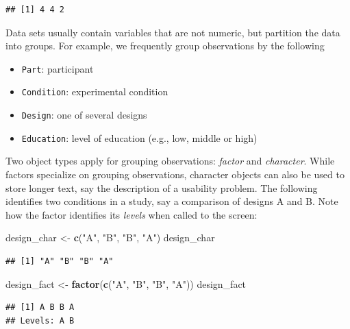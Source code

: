 \documentclass[]{svmono}
\newenvironment{Shaded}{\begin{snugshade}}{\end{snugshade}}
\newcommand{\KeywordTok}[1]{\textcolor[rgb]{0.13,0.29,0.53}{\textbf{#1}}}
\newcommand{\StringTok}[1]{\textcolor[rgb]{0.31,0.60,0.02}{#1}}
\newcommand{\NormalTok}[1]{#1}
\providecommand{\tightlist}{%
  \setlength{\itemsep}{0pt}\setlength{\parskip}{0pt}}
\theoremstyle{definition}
\theoremstyle{definition}
\theoremstyle{definition}
\theoremstyle{remark}
\begin{document}
\begin{verbatim}
## [1] 4 4 2
\end{verbatim}

Data sets usually contain variables that are not numeric, but partition
the data into groups. For example, we frequently group observations by
the following

\begin{itemize}
\tightlist
\item
  \texttt{Part}: participant
\item
  \texttt{Condition}: experimental condition
\item
  \texttt{Design}: one of several designs
\item
  \texttt{Education}: level of education (e.g., low, middle or high)
\end{itemize}

Two object types apply for grouping observations: \emph{factor} and
\emph{character}. While factors specialize on grouping observations,
character objects can also be used to store longer text, say the
description of a usability problem. The following identifies two
conditions in a study, say a comparison of designs A and B. Note how the
factor identifies its \emph{levels} when called to the screen:

\begin{Shaded}
\begin{Highlighting}[]
\NormalTok{design_char <-}\StringTok{ }\KeywordTok{c}\NormalTok{(}\StringTok{"A"}\NormalTok{, }\StringTok{"B"}\NormalTok{, }\StringTok{"B"}\NormalTok{, }\StringTok{"A"}\NormalTok{)}
\NormalTok{design_char}
\end{Highlighting}
\end{Shaded}

\begin{verbatim}
## [1] "A" "B" "B" "A"
\end{verbatim}

\begin{Shaded}
\begin{Highlighting}[]
\NormalTok{design_fact <-}\StringTok{ }\KeywordTok{factor}\NormalTok{(}\KeywordTok{c}\NormalTok{(}\StringTok{"A"}\NormalTok{, }\StringTok{"B"}\NormalTok{, }\StringTok{"B"}\NormalTok{, }\StringTok{"A"}\NormalTok{))}
\NormalTok{design_fact}
\end{Highlighting}
\end{Shaded}

\begin{verbatim}
## [1] A B B A
## Levels: A B
\end{verbatim}
\end{document}
